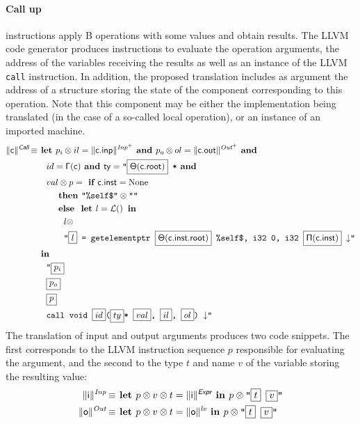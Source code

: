 \documentclass{llncs}
\newcommand{\trad}[2]{\ensuremath{\lVert \textsf{#1} \rVert^{\textit{#2}}}}
\newcommand{\nl}[0]{\ensuremath{\downarrow}}
\DeclareMathOperator{\isdef}{\equiv}
\DeclareMathOperator{\lbl}{\mathcal{L}()}
\newcommand{\llvm}[1]{\texttt{#1}}
\newcommand{\B}[1]{\textsf{#1}}
\newcommand{\ListOf}[1]{$\mbox{#1}^+$}
\newcommand{\IF}[0]{\textbf{ if }}
\newcommand{\ELSE}[0]{\textbf{ else }}
\newcommand{\THEN}[0]{\textbf{ then }}
\newcommand{\LET}[0]{\textbf{ let }}
\newcommand{\IN}[0]{\textbf{ in }}
\newcommand{\AND}[0]{\textbf{ and }}
\newcommand{\PH}[1]{\framebox{$#1$}}
\newcommand{\sep}[0]{\otimes}
\newcommand{\Global}[0]{\ensuremath{\sf\Gamma}}
\newcommand{\idx}[0]{\ensuremath{\sf\Pi}}
\newcommand{\state}[0]{\ensuremath{\sf\Theta}}
\begin{document}
\paragraph{Call up} instructions apply B operations with some values and obtain
results. The LLVM code generator produces instructions to evaluate the operation
arguments, the address of the variables receiving the results as well as an
instance of the LLVM \llvm{call} instruction. In addition, the proposed
translation includes as argument the address of a structure storing the state of
the component corresponding to this operation. Note that this component may be
either the implementation being translated (in the case of a so-called local
operation), or an instance of an imported machine.
\begin{align*}
  \trad{c}{\B{Call}} \isdef 
  & \LET p_i \sep il = \trad{c.inp}{\ListOf{Inp}} \AND p_o \sep ol = 
  \trad{c.out}{\ListOf{Out}} \AND \\
  & \quad id = \Global(\B{c}) \AND ty = \llvm{"\PH{\state(\B{c.root})} *} \AND \\
  & \quad val \sep p = \IF \B{c.inst} = \text{None} \\
  & \quad \quad \THEN \llvm{"\%self\$"} \sep \llvm{""} \\
  & \quad \quad \ELSE \LET l = \lbl \IN \\
  & \quad \quad \quad l \sep \\
  & \quad \quad \quad \llvm{"\PH{l} = getelementptr \PH{ \state({\B{c.inst.root}})} \%self\$, i32 0, i32 \PH{\idx(\B{c.inst})} \nl"} \\
  & \IN \\
  & \quad \llvm{"\PH{p_i}} \\
  & \quad \llvm{\PH{p_o}} \\
  & \quad \llvm{\PH{p}} \\
  & \quad \llvm{call void \PH{id}(\PH{ty}* \PH{val}, \PH{il}, \PH{ol}) \nl"}
\end{align*}
The translation of input and output arguments produces two code snippets. The
first corresponds to the LLVM instruction sequence $p$ responsible for
evaluating the argument, and the second to the type $t$ and name $v$ of the
variable storing the resulting value:
\begin{align*}
  \trad{i}{Inp} \isdef 
  & \LET p \sep v \sep t = \trad{i}{\B{Expr}} \IN p \sep \llvm{"\PH{t} \PH{v}"}\\
  \trad{o}{Out} \isdef 
  & \LET p \sep v \sep t = \trad{o}{lv} \IN p \sep \llvm{"\PH{t} \PH{v}"}
\end{align*}
\end{document}
